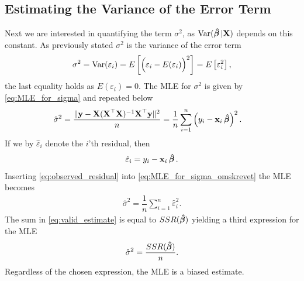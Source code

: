 \subsection{Estimating the Variance of the Error Term}
Next we are interested in quantifying the term $\sigma^2$, as $\operatorname{\text{Var}}(\operatorname{\boldsymbol{\hat{\beta}}}|\mathbf{X})$ depends on this constant.
As previously stated $\sigma^2$ is the variance of the error term
\begin{align*}
    \sigma^2 = \operatorname{\text{Var}}(\varepsilon_i) =  E\left[\Big(\varepsilon_i - E(\varepsilon_i)\Big)^2\right] = E\left[\varepsilon_i^2\right],
\end{align*}
the last equality holds as $E(\varepsilon_i) = 0$.
The MLE for $\sigma^2$ is given by \eqref{eq:MLE_for_sigma} and repeated below
\begin{align}\label{eq:MLE_for_sigma_omskrevet}
    \hat{\sigma}^2 &= \frac{\|\textbf{y} - \textbf{X}( \textbf{X}^\top\textbf{X} )^{-1}\textbf{X}^\top\textbf{y}\|^2}{n}
    = \dfrac{1}{n}\sum_{i=1}^n \left(y_i - \mathbf{x}_i\operatorname{\boldsymbol{\hat{\beta}}}\right)^2.
\end{align}
If we by $\hat{\varepsilon}_i$ denote the $i$'th residual, then
\begin{align}\label{eq:observed_residual}
    \hat{\varepsilon}_i = y_i - \mathbf{x}_i\operatorname{\boldsymbol{\hat{\beta}}}.
\end{align}
Inserting \eqref{eq:observed_residual} into \eqref{eq:MLE_for_sigma_omskrevet} the MLE becomes
\begin{align}\label{eq:valid_estimate}
    \hat{\sigma}^2 = \dfrac{1}{n}\sum_{i=1}^n \hat{\varepsilon}_i^2.
\end{align}
The sum in \eqref{eq:valid_estimate} is equal to $SSR(\operatorname{\boldsymbol{\hat{\beta}}})$ yielding a third expression for the MLE
\begin{align}
    \hat{\sigma}^2 = \frac{SSR(\operatorname{\boldsymbol{\hat{\beta}}})}{n}.
\end{align}
Regardless of the chosen expression, the MLE is a biased estimate.
